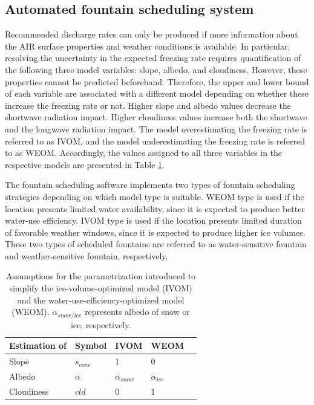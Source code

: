 \subsection{Automated fountain scheduling system}

Recommended discharge rates can only be produced if more information about the \ac{AIR} surface properties and
weather conditions is available. In particular, resolving the uncertainty in the expected freezing rate requires
quantification of the following three model variables: slope, albedo, and cloudiness. However, these properties
cannot be predicted beforehand. Therefore, the upper and lower bound of each variable are associated with a
different model depending on whether these increase the freezing rate or not.  Higher slope and albedo values
decrease the shortwave radiation impact. Higher cloudiness values increase both the shortwave and the longwave
radiation impact. The model overestimating the freezing rate is referred to as \ac{IVOM}, and the model
underestimating the freezing rate is referred to as \ac{WEOM}. Accordingly, the values
assigned to all three variables in the respective models are presented in Table \ref{tab:assumptions}.

The fountain scheduling software implements two types of fountain scheduling strategies depending on which
model type is suitable. \ac{WEOM} type is used if the location presents limited water availability, since it is expected to
produce better water-use efficiency. \ac{IVOM} type is used if the location presents limited duration of favorable
weather windows, since it is expected to produce higher ice volumes. These two types of scheduled fountains are referred to as water-sensitive fountain and weather-sensitive fountain, respectively.

\begin{table}[htb]
	\centering
	\caption{Assumptions for the parametrization introduced to simplify the ice-volume-optimized model (IVOM) and
		the water-use-efficiency-optimized model (WEOM). $\alpha_{snow/ice}$ represents albedo of snow or ice, respectively.}
	\label{tab:assumptions}
	\begin{tabular}{|lllll|}
		\toprule
		\textbf{Estimation of}          & \textbf{Symbol} & \textbf{IVOM}   & \textbf{WEOM}  &                       \\\midrule
		\multicolumn{1}{|l}{Slope}      & $s_{cone}$      & 1               & 0              & \multicolumn{1}{l|}{} \\
		\multicolumn{1}{|l}{Albedo}     & $\alpha$        & $\alpha_{snow}$ & $\alpha_{ice}$ & \multicolumn{1}{l|}{} \\
		\multicolumn{1}{|l}{Cloudiness} & $cld$           & $0$             & $1$            & \multicolumn{1}{l|}{} \\\bottomrule
	\end{tabular}
\end{table}

